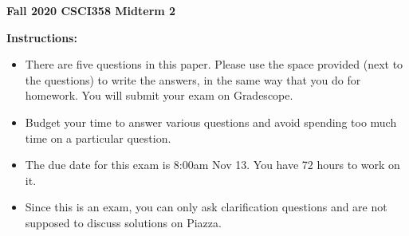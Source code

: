 \documentclass[12pt,twoside]{article}
\renewcommand{\baselinestretch}{1.2}
\begin{document}
%
\setcounter{page}{0}
\begin{center}
	{\bf Fall 2020 CSCI358 Midterm 2}
\end{center}
%
\noindent
{\bf Instructions:} \\
%
\begin{itemize}
	\item There are five questions in this paper. Please use the space provided
	(next to the questions) to write the answers, in the same way that you do for homework. You will submit your exam on Gradescope.
	\item Budget your time to answer various questions and avoid spending
	too much time on a particular question.
	\item The due date for this exam is 8:00am Nov 13. You have 72 hours to work on it.
	\item Since this is an exam, you can only ask clarification questions and are not supposed to discuss solutions on Piazza.

\end{itemize}
%

\renewcommand{\baselinestretch}{2.0}
\normalsize
\end{document}
